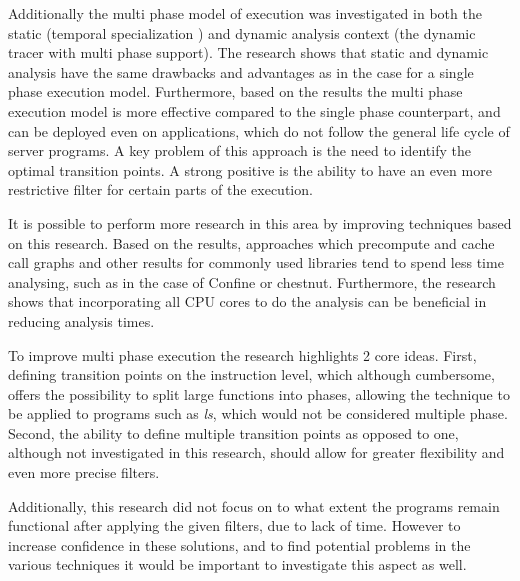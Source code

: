 Additionally the multi phase model of execution was investigated in both the static (temporal specialization \cite{ref_mp_1}) and dynamic analysis context (the dynamic tracer with multi phase support).
The research shows that static and dynamic analysis have the same drawbacks and advantages as in the case for a single phase execution model.
Furthermore, based on the results the multi phase execution model is more effective compared to the single phase counterpart, and can be deployed even on applications, which do not follow the general life cycle of server programs.
A key problem of this approach is the need to identify the optimal transition points.
A strong positive is the ability to have an even more restrictive filter for certain parts of the execution.

It is possible to perform more research in this area by improving techniques based on this research.
Based on the results, approaches which precompute and cache call graphs and other results for commonly used libraries tend to spend less time analysing, such as in the case of Confine or chestnut.
Furthermore, the research shows that incorporating all CPU cores to do the analysis can be beneficial in reducing analysis times.

To improve multi phase execution the research highlights 2 core ideas.
First, defining transition points on the instruction level, which although cumbersome, offers the possibility to split large functions into phases, allowing the technique to be applied to programs such as \textit{ls}, which would not be considered multiple phase.
Second, the ability to define multiple transition points as opposed to one, although not investigated in this research, should allow for greater flexibility and even more precise filters.

Additionally, this research did not focus on to what extent the programs remain functional after applying the given filters, due to lack of time.
However to increase confidence in these solutions, and to find potential problems in the various techniques it would be important to investigate this aspect as well.
